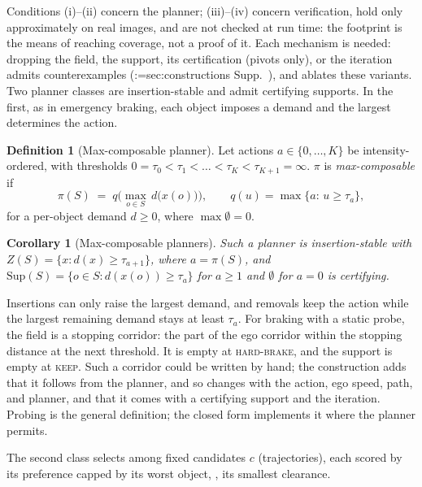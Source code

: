 \documentclass[10pt,twocolumn,letterpaper]{article}
\makeatletter
\newcommand{\Sup}{\mathrm{Sup}}   %
\newcommand{\field}{Z}            %
\newcommand{\policy}{\pi}         %
\newcommand{\dem}{d}              %
\newtheorem{corollary}{Corollary}
\theoremstyle{definition}
\newtheorem{definition}{Definition}
\theoremstyle{remark}
\DeclareRobustCommand{\supp}[1]{\def\supp@list{}\@for\supp@i:=#1\do{\ifx\supp@list\@empty\edef\supp@list{S-\supp@i}\else\edef\supp@list{\supp@list,S-\supp@i}\fi}%
\edef\supp@cmd{\noexpand\Cref*{\supp@list}}Supp.~\supp@cmd}
\makeatother
\begin{document}
Conditions (i)--(ii) concern the planner; (iii)--(iv) concern verification, hold only approximately on real images, and are not checked at run time: the footprint is the means of reaching coverage, not a proof of it.
Each mechanism is needed: dropping the field, the support, its certification (pivots only), or the iteration admits counterexamples (\supp{sec:constructions}), and  ablates these variants.
Two planner classes are insertion-stable and admit certifying supports.
In the first, as in emergency braking, each object imposes a demand and the largest determines the action.

\begin{definition}[Max-composable planner]
Let actions $a\in\{0,\dots,K\}$ be intensity-ordered, with thresholds $0=\tau_0<\tau_1<\dots<\tau_K<\tau_{K+1}=\infty$.
$\policy$ is \emph{max-composable} if
\begin{equation}
\policy(S) \;=\; q\Big(\max_{o\in S}\, \dem\big(x(o)\big)\Big),\qquad q(u)=\max\{a:\,u\ge\tau_a\},
\label{eq:maxcomp}
\end{equation}
for a per-object demand $\dem\ge 0$, where $\max\emptyset=0$.\label{def:maxcomp}
\end{definition}

\begin{corollary}[Max-composable planners]
Such a planner is insertion-stable with $\field(S)=\{x:\dem(x)\ge\tau_{a+1}\}$, where $a=\policy(S)$, and $\Sup(S)=\{o\in S:\dem(x(o))\ge\tau_a\}$ for $a\ge1$ and $\emptyset$ for $a=0$ is certifying.\label{cor:maxcomp}
\end{corollary}

Insertions can only raise the largest demand, and removals keep the action while the largest remaining demand stays at least $\tau_a$.
For braking with a static probe, the field is a stopping corridor: the part of the ego corridor within the stopping distance at the next threshold.
It is empty at \textsc{hard-brake}, and the support is empty at \textsc{keep}.
Such a corridor could be written by hand; the construction adds that it follows from the planner, and so changes with the action, ego speed, path, and planner, and that it comes with a certifying support and the iteration.
Probing is the general definition; the closed form implements it where the planner permits.

The second class selects among fixed candidates $c$ (trajectories), each scored by its preference capped by its worst object, \eg, its smallest clearance.
\end{document}
